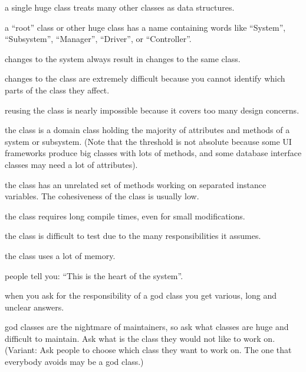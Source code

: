 \documentclass[a4paper,10pt,twoside]{book}
\begin{document}
\begin{bulletlist}
\item a single huge class treats many other classes as data structures.

\item a ``root'' class or other huge class has a name containing words like ``System'', ``Subsystem'', ``Manager'', ``Driver'', or ``Controller''.

\item changes to the system always result in changes to the same class.

\item changes to the class are extremely difficult because you cannot identify which parts of the class they affect.

\item reusing the class is nearly impossible because it covers too many design concerns.

\item the class is a domain class holding the majority of attributes and methods of a system or subsystem. (Note that the threshold is not absolute because some UI frameworks produce big classes with lots of methods, and some database interface classes may need a lot of attributes). 

\item the class has an unrelated set of methods working on separated instance variables. The cohesiveness of the class is usually low. 

\item the class requires long compile times, even for small modifications.

\item the class is difficult to test due to the many responsibilities it assumes.

\item the class uses a lot of memory.

\item people tell you: ``This is the heart of the system''.

\item when you ask for the responsibility of a god class you get various, long and unclear answers.

\item god classes are the nightmare of maintainers, so ask what classes are huge and difficult to maintain. Ask what is the class they would not like to work on. (Variant: Ask people to choose which class they want to work on. The one that everybody avoids may be a god class.)
\end{bulletlist}
\end{document}
